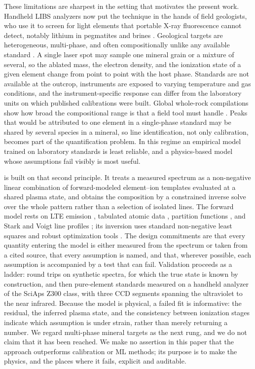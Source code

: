 These limitations are sharpest in the setting that motivates the present work.
Handheld LIBS analyzers now put the technique in the hands of field geologists, who use it to screen for light elements that portable X-ray fluorescence cannot detect, notably lithium in pegmatites and brines \citep{senesi2021handheld,sweetapple2015lithium,korbel2024lithium,harmon2023muscovite}.
Geological targets are heterogeneous, multi-phase, and often compositionally unlike any available standard \citep{harmon2013geochem}.
A single laser spot may sample one mineral grain or a mixture of several, so the ablated mass, the electron density, and the ionization state of a given element change from point to point with the host phase.
Standards are not available at the outcrop, instruments are exposed to varying temperature and gas conditions, and the instrument-specific response can differ from the laboratory units on which published calibrations were built.
Global whole-rock compilations show how broad the compositional range is that a field tool must handle \citep{gard2019wholerock}.
Peaks that would be attributed to one element in a single-phase standard may be shared by several species in a mineral, so line identification, not only calibration, becomes part of the quantification problem.
In this regime an empirical model trained on laboratory standards is least reliable, and a physics-based model whose assumptions fail visibly is most useful.

\alibz{} \citep{alibz} is built on that second principle.
It treats a measured spectrum as a non-negative linear combination of forward-modeled element--ion templates evaluated at a shared plasma state, and obtains the composition by a constrained inverse solve over the whole pattern rather than a selection of isolated lines.
The forward model rests on LTE emission \citep{griem1997principles}, tabulated atomic data \citep{kramida2023asd}, partition functions \citep{barklem2016partition}, and Stark and Voigt line profiles \citep{konjevic2002review}; its inversion uses standard non-negative least squares \citep{lawson1995nnls} and robust optimization tools \citep{virtanen2020scipy}.
The design commitments are that every quantity entering the model is either measured from the spectrum or taken from a cited source, that every assumption is named, and that, wherever possible, each assumption is accompanied by a test that can fail.
Validation proceeds as a ladder: round trips on synthetic spectra, for which the true state is known by construction, and then pure-element standards measured on a handheld analyzer of the SciAps Z300 class, with three CCD segments spanning the ultraviolet to the near infrared.
Because the model is physical, a failed fit is informative: the residual, the inferred plasma state, and the consistency between ionization stages indicate which assumption is under strain, rather than merely returning a number.
We regard multi-phase mineral targets as the next rung, and we do not claim that it has been reached.
We make no assertion in this paper that the approach outperforms calibration or ML methods; its purpose is to make the physics, and the places where it fails, explicit and auditable.

